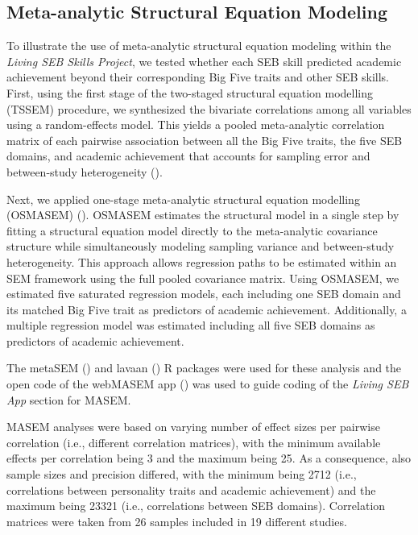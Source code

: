 \documentclass[
  man,
  longtable,
  nolmodern,
  notxfonts,
  notimes,
  colorlinks=true,linkcolor=blue,citecolor=blue,urlcolor=blue]{apa7}
\begin{document}
\subsection{Meta-analytic Structural Equation
Modeling}\label{meta-analytic-structural-equation-modeling}

To illustrate the use of meta-analytic structural equation modeling
within the \emph{Living SEB Skills Project}, we tested whether each SEB
skill predicted academic achievement beyond their corresponding Big Five
traits and other SEB skills. First, using the first stage of the
two-staged structural equation modelling (TSSEM) procedure, we
synthesized the bivariate correlations among all variables using a
random-effects model. This yields a pooled meta-analytic correlation
matrix of each pairwise association between all the Big Five traits, the
five SEB domains, and academic achievement that accounts for sampling
error and between-study heterogeneity
().

Next, we applied one-stage meta-analytic structural equation modelling
(OSMASEM) (). OSMASEM estimates the structural model in a single step
by fitting a structural equation model directly to the meta-analytic
covariance structure while simultaneously modeling sampling variance and
between-study heterogeneity. This approach allows regression paths to be
estimated within an SEM framework using the full pooled covariance
matrix. Using OSMASEM, we estimated five saturated regression models,
each including one SEB domain and its matched Big Five trait as
predictors of academic achievement. Additionally, a multiple regression
model was estimated including all five SEB domains as predictors of
academic achievement.

The metaSEM () and lavaan
() R
packages were used for these analysis and the open code of the webMASEM
app () was used to guide coding of the \emph{Living SEB App} section for
MASEM.

MASEM analyses were based on varying number of effect sizes per pairwise
correlation (i.e., different correlation matrices), with the minimum
available effects per correlation being 3 and the maximum being 25. As a
consequence, also sample sizes and precision differed, with the minimum
being 2712 (i.e., correlations between personality traits and academic
achievement) and the maximum being 23321 (i.e., correlations between SEB
domains). Correlation matrices were taken from 26 samples included in 19
different studies.
\end{document}
